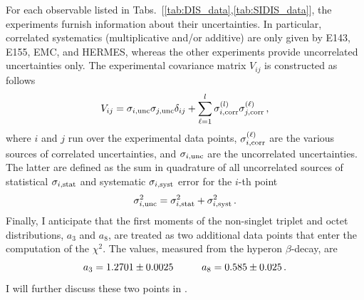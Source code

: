 For each observable listed in Tabs.~[\ref{tab:DIS_data},\ref{tab:SIDIS_data}], the experiments furnish information about their uncertainties. In particular, correlated systematics (multiplicative and/or additive) are only given by E143, E155, EMC, and HERMES, whereas the other experiments provide uncorrelated uncertainties only. The experimental covariance matrix $V_{ij}$ is constructed as follows
\begin{equation}
  V_{ij} =  \sigma_{i,\textrm{unc}} \sigma_{j,\textrm{unc}} \delta_{ij} + \sum_{\ell=1}^{l} \sigma_{i,\textrm{corr}}^{(l)} \sigma_{j,\textrm{corr}}^{(\ell)} \,,
  \label{eq:covariance_matrix}
\end{equation}
where $i$ and $j$ run over the experimental data points, $\sigma_{i,\textrm{corr}}^{(\ell)}$ are the various sources of correlated uncertainties, and $\sigma_{i,\textrm{unc}}$ are the uncorrelated uncertainties. The latter are defined as the sum in quadrature of all uncorrelated sources of statistical $\sigma_{i,\textrm{stat}}$ and systematic $\sigma_{i,\textrm{syst}}$ error for the $i$-th point
\begin{equation}
  \sigma_{i,\textrm{unc}}^2 = \sigma_{i,\textrm{stat}}^2 + \sigma_{i,\textrm{syst}}^2 \,.
\end{equation}
Finally, I anticipate that the first moments of the non-singlet triplet and octet distributions, $a_3$ and $a_8$, are treated as two additional data points that enter the computation of the $\chi^2$. The values, measured from the hyperon $\beta$-decay, are \cite{Nakamura_2010}
\begin{equation}
  a_3 = 1.2701 \pm 0.0025 \hspace{10mm} a_8 = 0.585 \pm 0.025 \,.
  \label{eq:a3_a8_values}
\end{equation}
I will further discuss these two points in .

